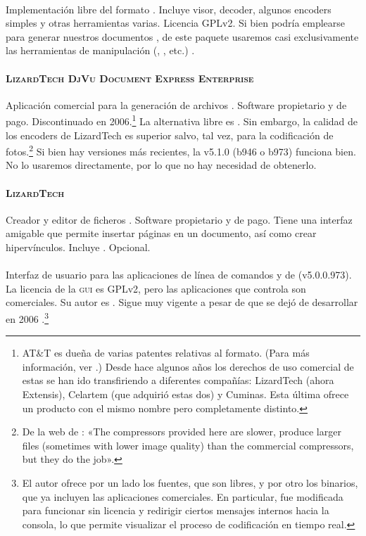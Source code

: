\documentclass[%
	a5paper,
	10pt,
	twoside,
	openright,
	final,
]{memoir}
\begin{document}
{	\paragraph{\djvulibre} Implementación libre del formato \djvu. Incluye visor, decoder, algunos encoders simples y otras herramientas varias. Licencia GPLv2. Si bien podría emplearse para generar nuestros documentos \djvu, de este paquete usaremos casi exclusivamente las herramientas de manipulación (, , etc.) \cite{DjVuLibre}.
	\paragraph{\textsc{LizardTech DjVu Document Express Enterprise}} Aplicación comercial para la generación de archivos \djvu. Software propietario y de pago. Discontinuado en 2006.\footnote{AT\&T es dueña de varias patentes relativas al formato. (Para más información, ver \cite{DjVuLicensing, DjVuOpenSourceLicensing}.) Desde hace algunos años los derechos de uso comercial de estas se han ido transfiriendo a diferentes compañías: LizardTech (ahora Extensis), Celartem (que adquirió estas dos) y Cuminas. Esta última ofrece un producto con el mismo nombre pero completamente distinto.} La alternativa libre es \djvulibre. Sin embargo, la calidad de los encoders de LizardTech es superior salvo, tal vez, para la codificación de fotos.\footnote{De la web de \djvulibre: «The compressors provided here are slower, produce larger files (sometimes with lower image quality) than the commercial compressors, but they do the job».} Si bien hay versiones más recientes, la v5.1.0 (b946 o b973) funciona bien. No lo usaremos directamente, por lo que no hay necesidad de obtenerlo.
	\paragraph{\textsc{LizardTech} \djvueditor} Creador y editor de ficheros \djvu. Software propietario y de pago. Tiene una interfaz amigable que permite insertar páginas en un documento, así como crear hipervínculos. Incluye \ocr. Opcional.
	\paragraph{\djvusmall} Interfaz de usuario para las aplicaciones de línea de comandos  y  de \dexpress (v5.0.0.973). La licencia de la \textsc{gui} es GPLv2, pero las aplicaciones que controla son comerciales. Su autor es \mondaytwothousand. Sigue muy vigente a pesar de que se dejó de desarrollar en 2006 \cite{DjVuSmall}.\footnote{El autor ofrece por un lado los fuentes, que son libres, y por otro los binarios, que ya incluyen las aplicaciones comerciales. En particular,  fue modificada para funcionar sin licencia y redirigir ciertos mensajes internos hacia la consola, lo que permite visualizar el proceso de codificación en tiempo real.}
}
\end{document}
